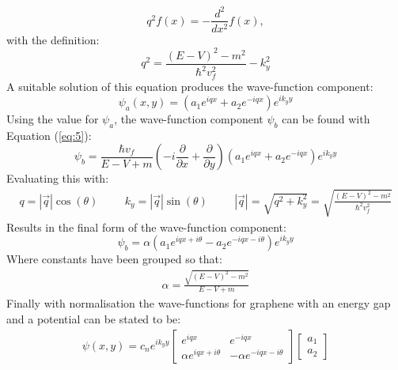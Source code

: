 			\begin{equation}
				q^{2}f\left(x\right)=-\frac{d^{2}}{d x^{2}}f\left(x\right),
			\end{equation}
			with the definition:
			\begin{equation}
				q^{2}=\frac{\left(E-V\right)^{2}-m^{2}}{\hbar^{2}v_{f}^{2}}-k_{y}^{2}
			\end{equation}
			A suitable solution of this equation produces the wave-function component:
			\begin{equation}
				\psi_{a}\left(x,y\right)=\left(a_{1}e^{iqx}+a_{2}e^{-iqx}\right)e^{ik_{y}y}
			\end{equation}
			Using the value for $\psi_{a}$, the wave-function component $\psi_{b}$ can be found with Equation (\ref{eq:5}):
			\begin{equation}
				\psi_{b}=\frac{\hbar v_{f}}{E-V+m}\left(-i\frac{\partial}{\partial x}+\frac{\partial}{\partial y}\right)\left(a_{1}e^{iqx}+a_{2}e^{-iqx}\right)e^{ik_{y}y}
			\end{equation}
			Evaluating this with:
			\begin{align}
				q=|\vec{q}|\cos(\theta)
				\hspace{1cm}
				k_{y}=|\vec{q}|\sin(\theta)\hspace{1cm}|\vec{q}|=\sqrt{q^{2}+k_{y}^{2}}=\sqrt{\frac{\left(E-V\right)^{2}-m^{2}}{\hbar^{2}v_{f}^{2}}}
			\end{align}
			Results in the final form of the wave-function component:
			\begin{equation}
				\psi_{b}=\alpha\left(a_{1} e^{iqx+i\theta}-a_{2} e^{-iqx-i\theta}\right)e^{ik_{y}y}
			\end{equation}
			Where constants have been grouped so that:
			\begin{align}
				\alpha=\frac{\sqrt{\left(E-V\right)^{2}-m^{2}}}{E-V+m}
			\end{align}
			Finally with normalisation the wave-functions for graphene with an energy gap and a potential can be stated to be:
			\begin{align}
				\psi\left(x,y\right)=
				c_{n}e^{ik_{y}y}
				\left[\begin{array}{ccc}
					e^{iqx}&e^{-iqx}\\
					\alpha e^{iqx+i\theta}&-\alpha e^{-iqx-i\theta}
				\end{array}\right]
				\left[\begin{array}{ccc}
					a_{1}\\
					a_{2}
				\end{array}\right]
				\label{introduction-wf}
			\end{align}
